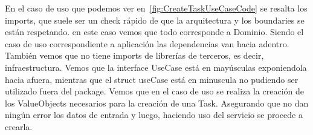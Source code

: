 En el caso de uso que podemos ver en~\cref{fig:CreateTaskUseCaseCode} se resalta los imports, que suele ser un check rápido de que la arquitectura y los boundaries se están respetando.
en este caso vemos que todo corresponde a Dominio.
Siendo el caso de uso correspondiente a aplicación las dependencias van hacia adentro.
También vemos que no tiene imports de librerías de terceros, es decir, infraestructura.
Vemos que la interface UseCase está en mayúsculas exponiendola hacia afuera, mientras que el struct useCase está en minuscula no pudiendo ser utilizado fuera del package.
Vemos que en el caso de uso se realiza la creación de los ValueObjects necesarios para la creación de una Task.
Asegurando que no dan ningún error los datos de entrada y luego, haciendo uso del servicio se procede a crearla.

\begin{figure}[H]
    \centering

\end{figure}
